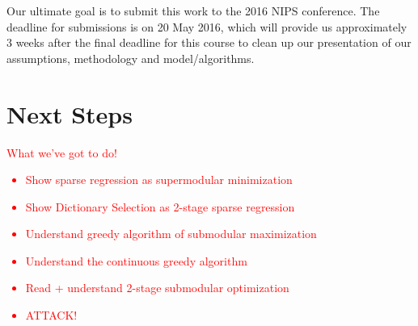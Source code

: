 \documentclass{article}
\begin{document}
Our ultimate goal is to submit this work to the 2016 NIPS conference. The deadline for submissions is on 20 May 2016, which will provide us approximately 3 weeks after the final deadline for this course to clean up our presentation of our assumptions, methodology and model/algorithms.

\section{Next Steps} \label{next steps}

\textcolor{red}{What we've got to do!
\begin{itemize}
\item{Show sparse regression as supermodular minimization}
\item{Show Dictionary Selection as 2-stage sparse regression}
\item{Understand greedy algorithm of submodular maximization}
\item{Understand the continuous greedy algorithm}
\item{Read + understand 2-stage submodular optimization}
\item{ATTACK!}
\end{itemize}}



\end{document}
